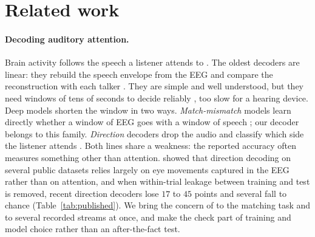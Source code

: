 \section{Related work}
\label{sec:related}

\paragraph{Decoding auditory attention.}
Brain activity follows the speech a listener attends to \citep{ding2012,lalor2009}.
The oldest decoders are linear: they rebuild the speech envelope from the EEG and
compare the reconstruction with each talker \citep{osullivan2015}. They are
simple and well understood, but they need windows of tens of seconds to decide
reliably \citep{geirnaert2021}, too slow for a hearing device. Deep models
shorten the window in two ways. \emph{Match-mismatch} models learn directly
whether a window of EEG goes with a window of speech
\citep{accou2021,monesi2020,puffay2023}; our decoder belongs to this family.
\emph{Direction} decoders drop the audio and classify which side the listener
attends
\citep{vandecappelle2021,yan2024darnet,fan2025listennet,ni2024dbpnet,xu2024densenet,zhang2025swim}.
Both lines share a weakness: the reported accuracy often measures something other
than attention. \citet{rotaru2024} showed that direction decoding on several
public datasets relies largely on eye movements captured in the EEG rather than
on attention, and when within-trial leakage between training and test is removed,
recent direction decoders lose $17$ to $45$ points and several fall to chance
\citep{alavi2026neurotoken} (Table~\ref{tab:published}). We bring the concern of
\citet{rotaru2024} to the matching task and to several recorded streams at once,
and make the check part of training and model choice rather than an
after-the-fact test.

